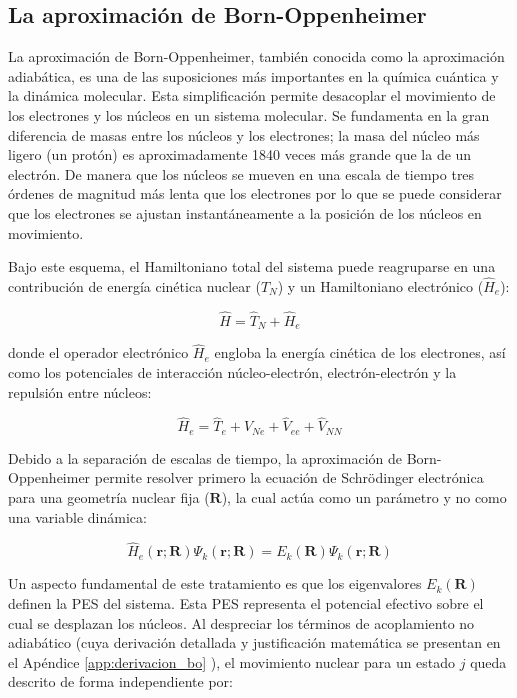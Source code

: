 \subsection{La aproximación de Born-Oppenheimer}

La aproximación de Born-Oppenheimer, también conocida como la aproximación adiabática, es una de las suposiciones más importantes en la química cuántica y la dinámica molecular. Esta simplificación permite desacoplar el movimiento de los electrones y los núcleos en un sistema molecular. Se fundamenta en la gran diferencia de masas entre los núcleos y los electrones; la masa del núcleo más ligero (un protón) es aproximadamente 1840 veces más grande que la de un electrón. De manera que los núcleos se mueven en una escala de tiempo tres órdenes de magnitud más lenta que los electrones por lo que se puede considerar que los electrones se ajustan instantáneamente a la posición de los núcleos en movimiento. 

Bajo este esquema, el Hamiltoniano total del sistema puede reagruparse en una contribución de energía cinética nuclear ($\hat{T}_N$) y un Hamiltoniano electrónico ($\hat{H}_e$):

\begin{equation}
    \hat{H} = \hat{T}_N + \hat{H}_e
    \label{eq:hamiltoniano_reagrupado}
\end{equation}

donde el operador electrónico $\hat{H}_e$ engloba la energía cinética de los electrones, así como los potenciales de interacción núcleo-electrón, electrón-electrón y la repulsión entre núcleos:

\begin{equation}
    \hat{H}_e = \hat{T}_e + \hat{V}_{Ne} + \hat{V}_{ee} + \hat{V}_{NN}
    \label{eq:hamiltoniano_electronico_def}
\end{equation}

Debido a la separación de escalas de tiempo, la aproximación de Born-Oppenheimer permite resolver primero la ecuación de Schrödinger electrónica para una geometría nuclear fija ($\mathbf{R}$), la cual actúa como un parámetro y no como una variable dinámica:

\begin{equation} 
    \hat{H}_e\left(\mathbf{r}; \mathbf{R}\right) \Psi_k(\mathbf{r}; \mathbf{R}) = E_k(\mathbf{R}) \Psi_k(\mathbf{r}; \mathbf{R}) 
    \label{eq:schrodinger_electronica_final}
\end{equation}

Un aspecto fundamental de este tratamiento es que los eigenvalores $E_k(\mathbf{R})$ definen la PES del sistema. Esta PES representa el potencial efectivo sobre el cual se desplazan los núcleos. Al despreciar los términos de acoplamiento no adiabático (cuya derivación detallada y justificación matemática se presentan en el Apéndice \ref{app:derivacion_bo} \cite{LeonPimentel2019}), el movimiento nuclear para un estado $j$ queda descrito de forma independiente por:

